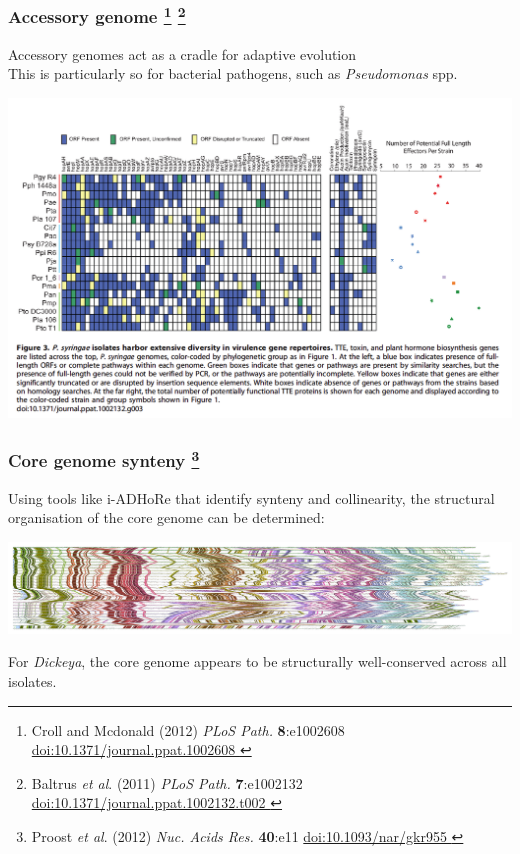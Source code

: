 \begin{frame}
  \frametitle{Accessory genome
   \footnote{\tiny{Croll and Mcdonald (2012) \textit{PLoS Path.} \textbf{8}:e1002608 \href{http://dx.doi.org/10.1371/journal.ppat.1002608}{doi:10.1371/journal.ppat.1002608
  }}}
    \footnote{\tiny{Baltrus \textit{et al}. (2011) \textit{PLoS Path.} \textbf{7}:e1002132 \href{http://dx.doi.org/10.1371/journal.ppat.1002132.t002}{doi:10.1371/journal.ppat.1002132.t002
    }}}  
  }
  Accessory genomes act as a cradle for adaptive evolution \\[0.2cm]
  This is particularly so for bacterial pathogens, such as \textit{Pseudomonas} spp.
  \begin{center}
      \includegraphics[height=0.5\textheight]{images/pa_virulence} 
  \end{center}
\end{frame}

\begin{frame}
  \frametitle{Core genome synteny
    \footnote{\tiny{Proost \textit{et al}. (2012) \textit{Nuc. Acids Res.} \textbf{40}:e11 \href{http://dx.doi.org/10.1093/nar/gkr955}{doi:10.1093/nar/gkr955
    }}}
  }
  Using tools like i-ADHoRe that identify synteny and collinearity, the structural organisation of the core genome can be determined:
  \begin{center}
      \includegraphics[width=1\textwidth]{images/dickeya_core_collinear_small} 
  \end{center}
  For \textit{Dickeya}, the core genome appears to be structurally well-conserved across all isolates.
\end{frame}

